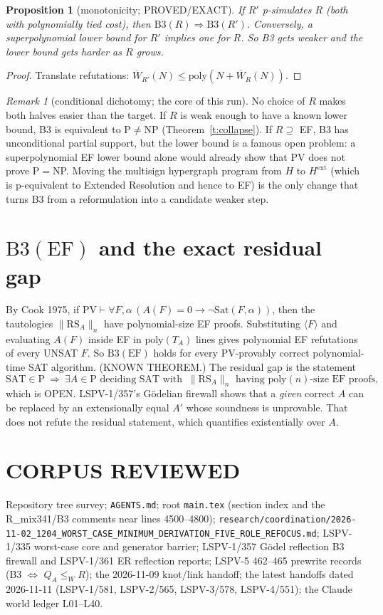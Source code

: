 \documentclass[11pt]{article}
\newtheorem{proposition}[theorem]{Proposition}
\theoremstyle{definition}
\theoremstyle{remark}
\newtheorem{remark}[theorem]{Remark}
\newcommand{\Wbar}{\overline{W}}
\begin{document}
\begin{proposition}[monotonicity; PROVED/EXACT]\label{p:mono}
If $R'$ p-simulates $R$ (both with polynomially tied cost), then $\mathrm{B3}(R)\Rightarrow\mathrm{B3}(R')$. Conversely, a superpolynomial lower bound for $R'$ implies one for $R$. So B3 gets weaker and the lower bound gets harder as $R$ grows.
\end{proposition}
\begin{proof}
Translate refutations: $\Wbar_{R'}(N)\le\mathrm{poly}(N+\Wbar_R(N))$.
\end{proof}

\begin{remark}[conditional dichotomy; the core of this run]\label{r:dich}
No choice of $R$ makes both halves easier than the target. If $R$ is weak enough to have a known lower bound, B3 is equivalent to P$\ne$NP (Theorem~\ref{t:collapse}). If $R\supseteq$ EF, B3 has unconditional partial support, but the lower bound is a famous open problem: a superpolynomial EF lower bound alone would already show that PV does not prove P$=$NP. Moving the multisign hypergraph program from $H$ to $H^{\mathrm{ext}}$ (which is p-equivalent to Extended Resolution and hence to EF) is the only change that turns B3 from a reformulation into a candidate weaker step.
\end{remark}

\section{$\mathrm{B3}(\mathrm{EF})$ and the exact residual gap}
By Cook 1975, if $\mathrm{PV}\vdash\forall F,\alpha\,(A(F)=0\to\neg\mathrm{Sat}(F,\alpha))$, then the tautologies $\|\mathrm{RS}_A\|_n$ have polynomial-size EF proofs. Substituting $\langle F\rangle$ and evaluating $A(F)$ inside EF in $\mathrm{poly}(T_A)$ lines gives polynomial EF refutations of every UNSAT $F$. So $\mathrm{B3}(\mathrm{EF})$ holds for every PV-provably correct polynomial-time SAT algorithm. (KNOWN THEOREM.) The residual gap is the statement
\[
\mathrm{SAT}\in\mathrm{P}\ \Longrightarrow\ \exists A\in\mathrm{P}\text{ deciding SAT with }\ \|\mathrm{RS}_A\|_n\text{ having }\mathrm{poly}(n)\text{-size EF proofs},
\]
which is OPEN. LSPV-1/357's Gödelian firewall shows that a \emph{given} correct $A$ can be replaced by an extensionally equal $A'$ whose soundness is unprovable. That does not refute the residual statement, which quantifies existentially over $A$.

\section*{CORPUS REVIEWED}
Repository tree survey; \texttt{AGENTS.md}; root \texttt{main.tex} (section index and the R\_mix341/B3 comments near lines 4500--4800); \texttt{research/coordination/2026-11-02\_1204\_WORST\_CASE\_MINIMUM\_DERIVATION\_FIVE\_ROLE\_REFOCUS.md}; LSPV-1/335 worst-case core and generator barrier; LSPV-1/357 Gödel reflection B3 firewall and LSPV-1/361 ER reflection reports; LSPV-5 462--465 prewrite records (B3 $\iff$ $Q_A\le_W R$); the 2026-11-09 knot/link handoff; the latest handoffs dated 2026-11-11 (LSPV-1/581, LSPV-2/565, LSPV-3/578, LSPV-4/551); the Claude world ledger L01--L40.
\end{document}
